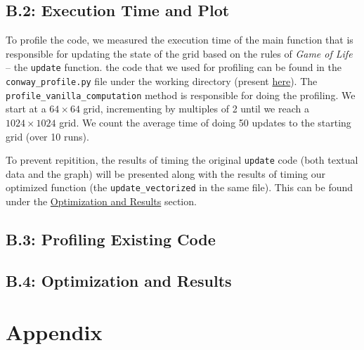 \documentclass[a4paper,12pt]{article}
\begin{document}
\subsection{B.2: Execution Time and Plot}
To profile the code, we measured the execution time of the main function that is responsible for updating the state of the grid based on the rules of \textit{Game of Life} -- the \verb|update| function. the code that we used for profiling can be found in the \verb|conway_profile.py| file under the working directory (present \href{https://github.com/paulmyr/DD2358-HPC25/blob/master/02_hpcds/bonus/conway_profile.py}{here}). The \verb|profile_vanilla_computation| method is responsible for doing the profiling. We start at a $64 \times 64$ grid, incrementing by multiples of 2 until we reach a $1024 \times 1024$ grid. We count the average time of doing 50 updates to the starting grid (over 10 runs). 

To prevent repitition, the results of timing the original \verb|update| code (both textual data and the graph) will be presented along with the results of timing our optimized function (the \verb|update_vectorized| in the same file). This can be found under the \hyperref[sec:b4]{Optimization and Results} section.
\subsection{B.3: Profiling Existing Code}
\subsection{B.4: Optimization and Results}
\label{sec:b4}
\section{Appendix}


\end{document}
